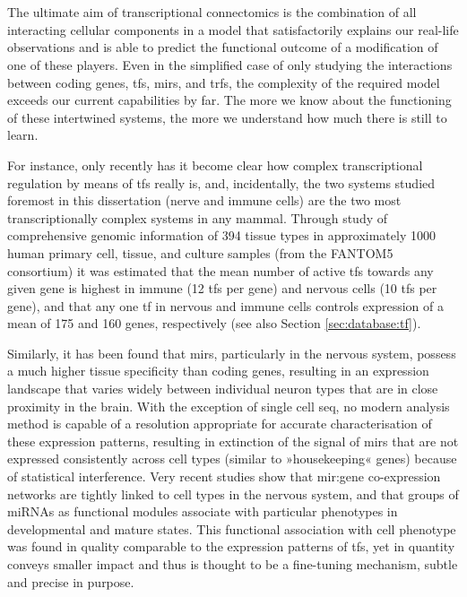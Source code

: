 
\section[Nested Multimodal Transcriptional Interactions - The Need for Connectomics]{}
The ultimate aim of transcriptional connectomics is the combination of all interacting cellular components in a model that satisfactorily explains our real-life observations and is able to predict the functional outcome of a modification of one of these players. Even in the simplified case of only studying the interactions between coding genes, \acp{tf}, \acp{mir}, and \acp{trf}, the complexity of the required model exceeds our current capabilities by far. The more we know about the functioning of these intertwined systems, the more we understand how much there is still to learn. 

For instance, only recently has it become clear how complex transcriptional regulation by means of \acp{tf} really is, and, incidentally, the two systems studied foremost in this dissertation (nerve and immune cells) are the two most transcriptionally complex systems in any mammal.\cite{Marbach2016} Through study of comprehensive genomic information of 394 tissue types in approximately 1000 human primary cell, tissue, and culture samples (from the FANTOM5 consortium) it was estimated that the mean number of active \acp{tf} towards any given gene is highest in immune (12 \acp{tf} per gene) and nervous cells (10 \acp{tf} per gene), and that any one \ac{tf} in nervous and immune cells controls expression of a mean of 175 and 160 genes, respectively (see also Section \ref{sec:database:tf}).\cite{Marbach2016}

Similarly, it has been found that \acp{mir}, particularly in the nervous system, possess a much higher tissue specificity than coding genes, resulting in an expression landscape that varies widely between individual neuron types that are in close proximity in the brain. With the exception of single cell \ac{seq}, no modern analysis method is capable of a resolution appropriate for accurate characterisation of these expression patterns, resulting in extinction of the signal of \acp{mir} that are not expressed consistently across cell types (similar to »housekeeping« genes) because of statistical interference. Very recent studies show that \ac{mir}:gene co-expression networks are tightly linked to cell types in the nervous system, and that groups of miRNAs as functional modules associate with particular phenotypes in developmental and mature states.\cite{Nowakowski2018} This functional association with cell phenotype was found in quality comparable to the expression patterns of \acp{tf}, yet in quantity conveys smaller impact and thus is thought to be a fine-tuning mechanism, subtle and precise in purpose. 

